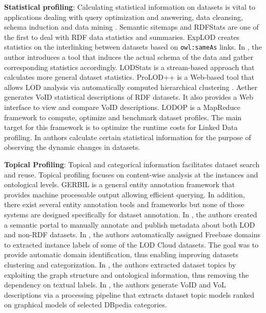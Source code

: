 \documentclass[runningheads,a4paper]{llncs}
\begin{document}
\textbf{Statistical profiling}: Calculating statistical information on datasets is vital to applications dealing with query optimization and answering, data cleansing, schema induction and data mining \cite{profilingWebOfData,datafinland2,6690016}. Semantic sitemaps \cite{Cyganiak:2008:SSE:1789394.1789457} and RDFStats \cite{Langegger:2009:RER:1674635.1674691} are one of the first to deal with RDF data statistics and summaries. ExpLOD \cite{Khatchadourian:2010:ESE:2155278.2155300} creates statistics on the interlinking between datasets based on \texttt{owl:sameAs} links. In \cite{semwebprofiling}, the author introduces a tool that induces the actual schema of the data and gather corresponding statistics accordingly. LODStats  \cite{Auer:2012:LEF:2413941.2413982} is a stream-based approach that calculates more general dataset statistics. ProLOD++ \cite{6816740} is a Web-based tool that allows LOD analysis via automatically computed hierarchical clustering \cite{5452762}. Aether \cite{makela-aether-2014} generates VoID statistical descriptions of RDF datasets. It also provides a Web interface to view and compare VoID descriptions. LODOP \cite{forchhammer_profiles_2014} is a MapReduce framework to compute, optimize and benchmark dataset profiles. The main target for this framework is to optimize the runtime costs for Linked Data profiling. In \cite{DyLDO} authors calculate certain statistical information for the purpose of observing the dynamic changes in datasets.

\textbf{Topical Profiling}: Topical and categorical information facilitates dataset search and reuse. Topical profiling focuses on content-wise analysis at the instances and ontological levels. GERBIL \cite{gerbil} is a general entity annotation framework that provides machine processable output allowing efficient querying. In addition, there exist several entity annotation tools and frameworks \cite{Cornolti:2013:FBE:2488388.2488411} but none of those systems are designed specifically for dataset annotation. In \cite{datafinalnd}, the authors created a semantic portal to manually annotate and publish metadata about both LOD and non-RDF datasets. In \cite{6690016}, the authors automatically assigned Freebase domains to extracted instance labels of some of the LOD Cloud datasets. The goal was to provide automatic domain identification, thus enabling improving datasets clustering and categorization. In \cite{Bohm:2012:LTG:2396761.2398718}, the authors extracted dataset topics by exploiting the graph structure and ontological information, thus removing the dependency on textual labels. In  \cite{scalableApproach}, the authors generate VoID and VoL descriptions via a processing pipeline that extracts dataset topic models ranked on graphical models of selected DBpedia categories.
\end{document}
